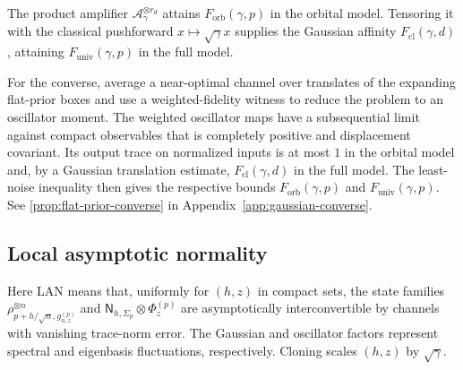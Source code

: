 \documentclass[11pt]{article}
\theoremstyle{remark}
\theoremstyle{plain}
\newcommand{\cA}{\mathcal A}
\newcommand{\ot}{\otimes}
\newcommand{\Forb}{F_{\mathrm{orb}}}
\newcommand{\Fcl}{F_{\mathrm{cl}}}
\newcommand{\Funiv}{F_{\mathrm{univ}}}
\begin{document}
The product amplifier \(\cA_\gamma^{\ot r_d}\) attains
\(\Forb(\gamma,p)\) in the orbital model.  Tensoring it with the classical
pushforward \(x\mapsto\sqrt\gamma x\) supplies the Gaussian affinity
\(\Fcl(\gamma,d)\), attaining \(\Funiv(\gamma,p)\) in the full model.

For the converse, average a near-optimal channel over translates of the
expanding flat-prior boxes and use a weighted-fidelity witness to reduce
the problem to an oscillator moment.  The weighted oscillator maps have a
subsequential limit against compact observables that is completely positive
and displacement covariant.  Its output trace on normalized inputs is at
most \(1\) in the orbital model and, by a Gaussian translation estimate,
\(\Fcl(\gamma,d)\) in the full model.  The least-noise inequality then
gives the respective bounds \(\Forb(\gamma,p)\) and \(\Funiv(\gamma,p)\).
See \cref{prop:flat-prior-converse} in Appendix~\ref{app:gaussian-converse}.

\subsection{Local asymptotic normality}
\label{sec:local-asymptotic-normality}

Here LAN means that, uniformly for \((h,z)\) in compact sets,
the state families \(\rho_{p+h/\sqrt n,g_{n,z}^{(p)}}^{\ot n}\) and
\(\mathsf N_{h,\Sigma_p}\ot\Phi_z^{(p)}\) are asymptotically interconvertible
by channels with vanishing trace-norm error.  The Gaussian and oscillator
factors represent spectral and eigenbasis fluctuations, respectively. Cloning
scales \((h,z)\) by \(\sqrt\gamma\).
\end{document}
